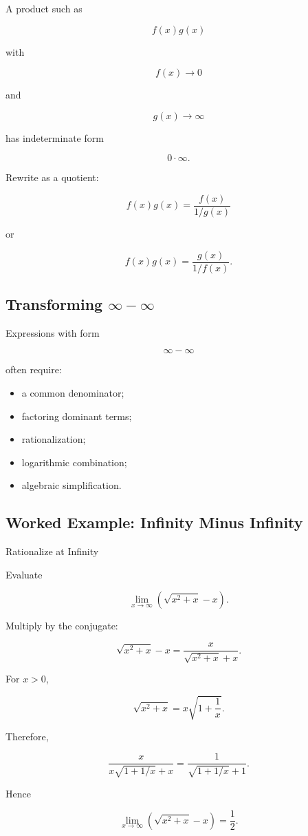 A product such as

\[
f(x)g(x)
\]

with

\[
f(x)\to0
\]

and

\[
g(x)\to\infty
\]

has indeterminate form

\[
0\cdot\infty.
\]

Rewrite as a quotient:

\[
\boxed{
f(x)g(x)
=
\frac{f(x)}{1/g(x)}
}
\]

or

\[
\boxed{
f(x)g(x)
=
\frac{g(x)}{1/f(x)}.
}
\]

\subsection{Transforming \(\infty-\infty\)}
\label{subsec:infinity-minus-infinity}

Expressions with form

\[
\infty-\infty
\]

often require:

\begin{itemize}
    \item a common denominator;
    \item factoring dominant terms;
    \item rationalization;
    \item logarithmic combination;
    \item algebraic simplification.
\end{itemize}

\subsection{Worked Example: Infinity Minus Infinity}
\label{subsec:worked-infinity-minus-infinity}

\begin{workedexamplebox}{Rationalize at Infinity}

Evaluate

\[
\lim_{x\to\infty}
\left(
\sqrt{x^2+x}-x
\right).
\]

Multiply by the conjugate:

\[
\sqrt{x^2+x}-x
=
\frac{
x
}{
\sqrt{x^2+x}+x
}.
\]

For \(x>0\),

\[
\sqrt{x^2+x}
=
x
\sqrt{
1+\frac1x
}.
\]

Therefore,

\[
\frac{x}{
x\sqrt{1+1/x}+x
}
=
\frac{
1
}{
\sqrt{1+1/x}+1
}.
\]

Hence

\begin{answerbox}
\[
\boxed{
\lim_{x\to\infty}
\left(
\sqrt{x^2+x}-x
\right)
=
\frac12.
}
\]
\end{answerbox}

\end{workedexamplebox}

